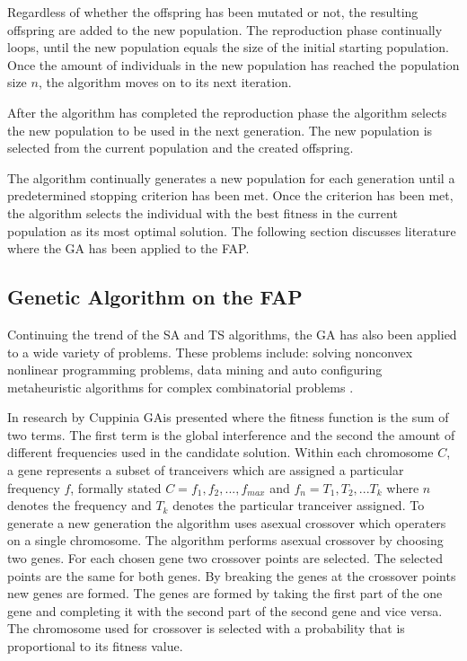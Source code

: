 Regardless of whether the offspring has been mutated or not, the resulting offspring are added to the new population. The reproduction phase continually loops, until the new population equals the size of the initial starting population. Once the amount of individuals in the new population has reached the population size $n$, the algorithm moves on to its next iteration.

After the algorithm has completed the reproduction phase the algorithm selects the new population to be used in the next generation. The new population is selected from the current population and the created offspring.

The algorithm continually generates a new population for each generation until a predetermined stopping criterion has been met. Once the criterion has been met, the algorithm selects the individual with the best fitness in the current population as its most optimal solution. The following section discusses literature where the \gls{GA} has been applied to the \gls{FAP}.

\subsection{Genetic Algorithm on the \gls{FAP}}
Continuing the trend of the \gls{SA} and \gls{TS} algorithms, the \gls{GA} has also been applied to a wide variety of problems. These problems include: solving nonconvex nonlinear programming problems\cite{GANonConvex}, data mining \cite{SelfAdaptiveDataMiningGA} and auto configuring metaheuristic algorithms for complex combinatorial problems \cite{AutoComplexMeta}.

In research by Cuppini\cite{}a \gls{GA}is presented where the fitness function is the sum of two terms. The first term is the global interference and the second the amount of different frequencies used in the candidate solution. Within each chromosome $C$, a gene represents a subset of tranceivers which are assigned a particular frequency $f$, formally stated $C = {f_1,f_2, ..., f_{max}}$ and $f_n = {T_1, T_2, ... T_k}$ where $n$ denotes the frequency and $T_k$ denotes the particular tranceiver assigned. To generate a new generation the algorithm uses asexual crossover which operaters on a single chromosome. The algorithm performs asexual crossover by choosing two genes. For each chosen gene two crossover points are selected. The selected points are the same for both genes. By breaking the genes at the crossover points new genes are formed. The genes are formed by taking the first part of the one gene and completing it with the second part of the second gene and vice versa. The chromosome used for crossover is selected with a probability that is proportional to its fitness value.

